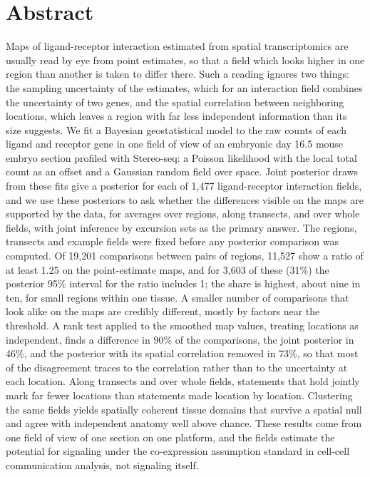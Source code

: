 \documentclass[10pt,letterpaper]{article}
\begin{document}
\section*{Abstract}
Maps of ligand-receptor interaction estimated from spatial transcriptomics are usually read by eye from point estimates, so that a field which looks higher in one region than another is taken to differ there. Such a reading ignores two things: the sampling uncertainty of the estimates, which for an interaction field combines the uncertainty of two genes, and the spatial correlation between neighboring locations, which leaves a region with far less independent information than its size suggests. We fit a Bayesian geostatistical model to the raw counts of each ligand and receptor gene in one field of view of an embryonic day 16.5 mouse embryo section profiled with Stereo-seq: a Poisson likelihood with the local total count as an offset and a Gaussian random field over space. Joint posterior draws from these fits give a posterior for each of 1,477 ligand-receptor interaction fields, and we use these posteriors to ask whether the differences visible on the maps are supported by the data, for averages over regions, along transects, and over whole fields, with joint inference by excursion sets as the primary answer. The regions, transects and example fields were fixed before any posterior comparison was computed. Of 19,201 comparisons between pairs of regions, 11,527 show a ratio of at least 1.25 on the point-estimate maps, and for 3,603 of these (31\%) the posterior 95\% interval for the ratio includes 1; the share is highest, about nine in ten, for small regions within one tissue. A smaller number of comparisons that look alike on the maps are credibly different, mostly by factors near the threshold. A rank test applied to the smoothed map values, treating locations as independent, finds a difference in 90\% of the comparisons, the joint posterior in 46\%, and the posterior with its spatial correlation removed in 73\%, so that most of the disagreement traces to the correlation rather than to the uncertainty at each location. Along transects and over whole fields, statements that hold jointly mark far fewer locations than statements made location by location. Clustering the same fields yields spatially coherent tissue domains that survive a spatial null and agree with independent anatomy well above chance. These results come from one field of view of one section on one platform, and the fields estimate the potential for signaling under the co-expression assumption standard in cell-cell communication analysis, not signaling itself.
\end{document}
